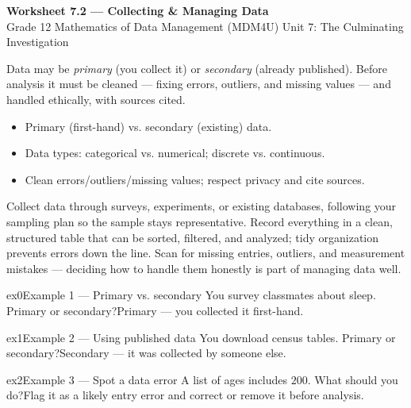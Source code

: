 \documentclass[11pt]{article}
\begin{document}
\begin{center}
{\LARGE\bfseries\color{titleblue}Worksheet 7.2 --- Collecting \& Managing Data}\\[2pt]
{\small Grade 12 Mathematics of Data Management (MDM4U) \textperiodcentered{} Unit 7: The Culminating Investigation}
\end{center}

\begin{ideabox}
Data may be \emph{primary} (you collect it) or \emph{secondary} (already published). Before analysis it must be cleaned --- fixing errors, outliers, and missing values --- and handled ethically, with sources cited.
\begin{itemize}[leftmargin=*,itemsep=2pt]
  \item Primary (first-hand) vs. secondary (existing) data.
  \item Data types: categorical vs. numerical; discrete vs. continuous.
  \item Clean errors/outliers/missing values; respect privacy and cite sources.
\end{itemize}
\end{ideabox}

\begin{learnbox}
Collect data through surveys, experiments, or existing databases, following your sampling plan so the sample stays representative.
Record everything in a clean, structured table that can be sorted, filtered, and analyzed; tidy organization prevents errors down the line.
Scan for missing entries, outliers, and measurement mistakes — deciding how to handle them honestly is part of managing data well.
\end{learnbox}


\begin{example}{ex0}{Example 1 --- Primary vs. secondary}
You survey classmates about sleep. Primary or secondary?\soln Primary --- you collected it first-hand.
\end{example}

\begin{example}{ex1}{Example 2 --- Using published data}
You download census tables. Primary or secondary?\soln Secondary --- it was collected by someone else.
\end{example}

\begin{example}{ex2}{Example 3 --- Spot a data error}
A list of ages includes $200$. What should you do?\soln Flag it as a likely entry error and correct or remove it before analysis.
\end{example}
\end{document}
